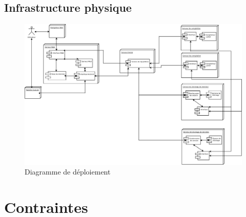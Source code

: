 \documentclass[a4paper,12pt]{article}
\begin{document}
\newpage
\subsection{Infrastructure physique}

\begin{figure}[!ht]
\begin{center}
  \includegraphics[width=1\textwidth,angle=90]{./Diagramme/DiagrammeDeploiement.jpg}
\end{center}
  \caption{Diagramme de déploiement}
  \label{déploiement}
\end{figure}
\newpage




 	


\section{Contraintes}
\end{document}

